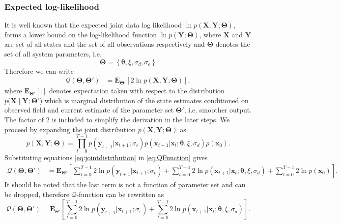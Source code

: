 \documentclass[]{article}
\begin{document}
\subsubsection{Expected log-likelihood} 
It is well known that the expected joint data log likelihood $\ln p(\mathbf X,\mathbf Y;\boldsymbol\Theta)$, forms a lower bound on the log-likelihood function $\ln p(\mathbf Y;\boldsymbol\Theta)$, where $\mathbf X$ and $\mathbf Y$ are set of all states and the set of all observations respectively and $\boldsymbol \Theta$ denotes the set of all system parameters, i.e.
\begin{equation}
	\boldsymbol\Theta = \left\lbrace \boldsymbol\theta, \xi, \sigma_d, \sigma_{\epsilon}\right\rbrace 
\end{equation}
 Therefore we can write
\begin{align}\label{eq:QFunction}
 \mathcal Q(\boldsymbol \Theta,\boldsymbol\Theta')&=\mathbf E_{\boldsymbol \Theta'}\left[2\ln p(\mathbf X,\mathbf Y;\boldsymbol \Theta)\right],
\end{align}
where $ \mathbf E_{\boldsymbol \Theta'}\left[ .\right] $ denotes expectation taken with respect to the distribution $p(\mathbf X\mid\mathbf Y;\boldsymbol \Theta'$) which is marginal distribution of the state estimates conditioned on observed field and current estimate of the parameter set $\boldsymbol\Theta'$, i.e. smoother output. The factor of $2$ is included to simplify the derivation in the later steps. We proceed by expanding the joint distribution $p(\mathbf X,\mathbf Y;\boldsymbol \Theta)$ as 
\begin{equation}\label{eq:jointdistribution}
 p(\mathbf X,\mathbf Y;\boldsymbol \Theta)=\prod_{t=0}^{T-1} p(\mathbf y_{t+1}|\mathbf x_{t+1}; \sigma_{\epsilon})p(\mathbf x_{t+1}|\mathbf x_{t};\boldsymbol \theta, \xi, \sigma_d)p(\mathbf x_0).
\end{equation}
 Substituting equations \eqref{eq:jointdistribution} in \eqref{eq:QFunction} gives
\begin{align}
 \mathcal Q(\boldsymbol \Theta,\boldsymbol\Theta')&=\mathbf E_{\boldsymbol\Theta'}\left[\sum_{t=0}^{T-1}2\ln p(\mathbf y_{t+1}|\mathbf x_{t+1};\sigma_{\epsilon})+\sum_{t=0}^{T-1}2\ln p(\mathbf x_{t+1}|\mathbf x_{t};\boldsymbol \theta,\xi, \sigma_d)+\sum_{t=0}^{T-1}2\ln p(\mathbf x_0)\right].
\end{align}
 It should be noted that the last term is not a function of parameter set and can be dropped, therefore $\mathcal Q$-function can be rewritten as
\begin{equation}\label{eq:QIntermsofJointDist}
\mathcal Q(\boldsymbol \Theta,\boldsymbol\Theta')=\mathbf E_{\Theta'}\left[\sum_{t=0}^{T-1}2\ln p(\mathbf y_{t+1}|\mathbf x_{t+1}; \sigma_{\epsilon})+\sum_{t=0}^{T-1}2\ln p(\mathbf x_{t+1}|\mathbf x_{t};\boldsymbol \theta, \xi ,\sigma_d)\right].
\end{equation}
\end{document}
